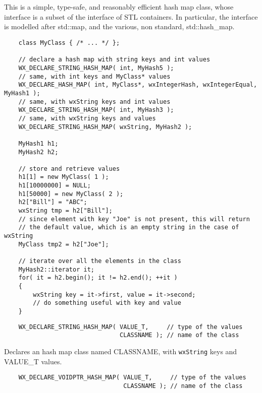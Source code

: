 \section{}\label{wxhashmap}

This is a simple, type-safe, and reasonably efficient hash map class,
whose interface is a subset of the interface of STL containers. In
particular, the interface is modelled after std::map, and the various,
non standard, std::hash_map.


\begin{verbatim}
    class MyClass { /* ... */ };

    // declare a hash map with string keys and int values
    WX_DECLARE_STRING_HASH_MAP( int, MyHash5 );
    // same, with int keys and MyClass* values
    WX_DECLARE_HASH_MAP( int, MyClass*, wxIntegerHash, wxIntegerEqual, MyHash1 );
    // same, with wxString keys and int values
    WX_DECLARE_STRING_HASH_MAP( int, MyHash3 );
    // same, with wxString keys and values
    WX_DECLARE_STRING_HASH_MAP( wxString, MyHash2 );

    MyHash1 h1;
    MyHash2 h2;

    // store and retrieve values
    h1[1] = new MyClass( 1 );
    h1[10000000] = NULL;
    h1[50000] = new MyClass( 2 );
    h2["Bill"] = "ABC";
    wxString tmp = h2["Bill"];
    // since element with key "Joe" is not present, this will return
    // the default value, which is an empty string in the case of wxString
    MyClass tmp2 = h2["Joe"];

    // iterate over all the elements in the class
    MyHash2::iterator it;
    for( it = h2.begin(); it != h2.end(); ++it )
    {
        wxString key = it->first, value = it->second;
        // do something useful with key and value
    }
\end{verbatim}


\begin{verbatim}
    WX_DECLARE_STRING_HASH_MAP( VALUE_T,     // type of the values
                                CLASSNAME ); // name of the class
\end{verbatim}

Declares an hash map class named CLASSNAME, with {\tt wxString} keys
and VALUE\_T values.

\begin{verbatim}
    WX_DECLARE_VOIDPTR_HASH_MAP( VALUE_T,     // type of the values
                                 CLASSNAME ); // name of the class
\end{verbatim}

